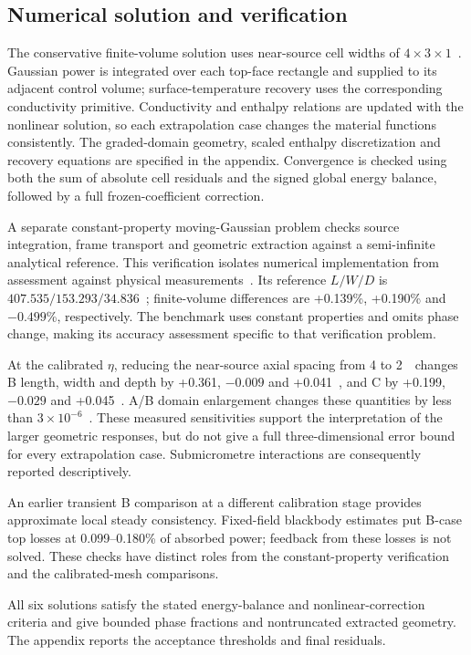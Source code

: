 \subsection{Numerical solution and verification}
The conservative finite-volume solution uses near-source cell widths of $4\times3\times1$~\um. Gaussian power is integrated over each top-face rectangle and supplied to its adjacent control volume; surface-temperature recovery uses the corresponding conductivity primitive. Conductivity and enthalpy relations are updated with the nonlinear solution, so each extrapolation case changes the material functions consistently. The graded-domain geometry, scaled enthalpy discretization and recovery equations are specified in the appendix. Convergence is checked using both the sum of absolute cell residuals and the signed global energy balance, followed by a full frozen-coefficient correction.

A separate constant-property moving-Gaussian problem checks source integration, frame transport and geometric extraction against a semi-infinite analytical reference. This verification isolates numerical implementation from assessment against physical measurements~\cite{oberkampf2002}. Its reference $L/W/D$ is $407.535/153.293/34.836$~\um; finite-volume differences are +0.139\%, +0.190\% and $-0.499$\%, respectively. The benchmark uses constant properties and omits phase change, making its accuracy assessment specific to that verification problem.

At the calibrated $\eta$, reducing the near-source axial spacing from 4 to 2~\um\ changes B length, width and depth by +0.361, $-0.009$ and +0.041~\um, and C by +0.199, $-0.029$ and +0.045~\um. A/B domain enlargement changes these quantities by less than $3\times10^{-6}$~\um. These measured sensitivities support the interpretation of the larger geometric responses, but do not give a full three-dimensional error bound for every extrapolation case. Submicrometre interactions are consequently reported descriptively.

An earlier transient B comparison at a different calibration stage provides approximate local steady consistency. Fixed-field blackbody estimates put B-case top losses at 0.099--0.180\% of absorbed power; feedback from these losses is not solved. These checks have distinct roles from the constant-property verification and the calibrated-mesh comparisons.

All six solutions satisfy the stated energy-balance and nonlinear-correction criteria and give bounded phase fractions and nontruncated extracted geometry. The appendix reports the acceptance thresholds and final residuals.

